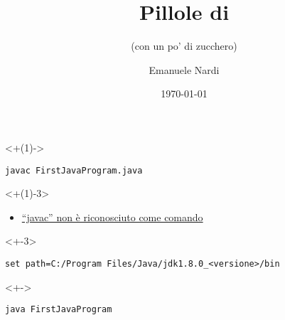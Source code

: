 \documentclass[12pt]{beamer}
\title{Pillole di {\javalogo}}
\subtitle{(con un po' di zucchero)}
\author{Emanuele Nardi}
\institute{Grandi Scuole}
\date{\today}
\begin{document}
\begin{frame}[label=title]
\maketitle
\end{frame}

\begin{frame}[fragile, label=hello-world]

\begin{uncoverenv}<+(1)->
\vfill
\begin{verbatim}
javac FirstJavaProgram.java
\end{verbatim}
\end{uncoverenv}

\uncover<+(1)-3>{
\begin{itemize}
	\item \href{https://www.fabriziorocca.it/guide/come-risolvere-il-problema-di-javac-non-riconosciuto-come-comando/}{``javac'' non è riconosciuto come comando}
\end{itemize}
}
\begin{uncoverenv}<+-3>
\begin{verbatim}
set path=C:/Program Files/Java/jdk1.8.0_<versione>/bin
\end{verbatim}
\end{uncoverenv}

\begin{uncoverenv}<+->
\begin{verbatim}
java FirstJavaProgram
\end{verbatim}
\end{uncoverenv}

\end{frame}
\end{document}
